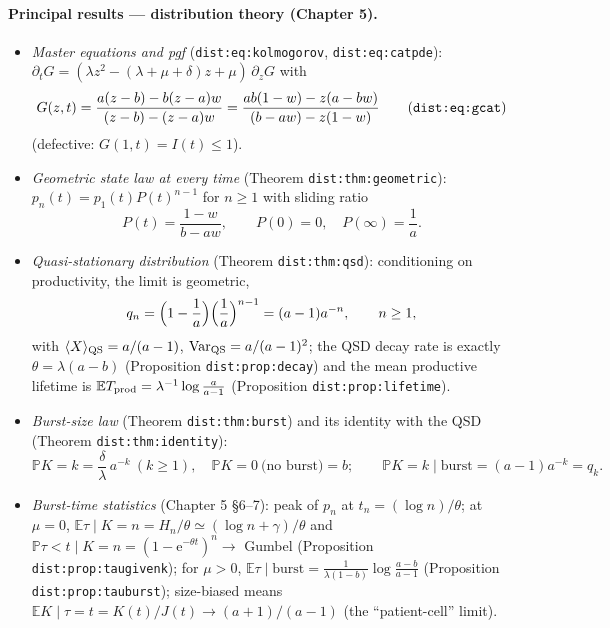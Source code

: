 \documentclass[11pt,a4paper]{article}
\newcommand{\PR}{\mathbb{P}}
\newcommand{\EX}{\mathbb{E}}
\newcommand{\Var}{\operatorname{Var}}
\newcommand{\ee}{\mathrm{e}}
\begin{document}
\paragraph{Principal results --- distribution theory (Chapter 5).}
\begin{itemize}
\item \emph{Master equations and pgf} (\texttt{dist:eq:kolmogorov},
  \texttt{dist:eq:catpde}): $\partial_tG=(\lambda z^2-(\lambda+\mu+\delta)z+
  \mu)\,\partial_zG$ with
  \[
  G(z,t)=\frac{a(z-b)-b(z-a)w}{(z-b)-(z-a)w}
  =\frac{ab(1-w)-z(a-bw)}{(b-aw)-z(1-w)}
  \qquad\text{(\texttt{dist:eq:gcat})}
  \]
  (defective: $G(1,t)=I(t)\le1$).
\item \emph{Geometric state law at every time} (Theorem
  \texttt{dist:thm:geometric}): $p_n(t)=p_1(t)P(t)^{n-1}$ for $n\ge1$ with
  sliding ratio
  \[
  P(t)=\frac{1-w}{b-aw},\qquad P(0)=0,\quad P(\infty)=\frac1a .
  \]
\item \emph{Quasi-stationary distribution} (Theorem \texttt{dist:thm:qsd}):
  conditioning on productivity, the limit is geometric,
  \[
  q_n=\Bigl(1-\frac1a\Bigr)\Bigl(\frac1a\Bigr)^{n-1}=(a-1)a^{-n},\qquad n\ge1,
  \]
  with $\langle X\rangle_{\rm QS}=a/(a-1)$, $\Var_{\rm QS}=a/(a-1)^2$; the
  QSD decay rate is exactly $\theta=\lambda(a-b)$ (Proposition
  \texttt{dist:prop:decay}) and the mean productive lifetime is
  $\EX{T_{\rm prod}}=\lambda^{-1}\log\frac{a}{a-1}$ (Proposition
  \texttt{dist:prop:lifetime}).
\item \emph{Burst-size law} (Theorem \texttt{dist:thm:burst}) and its
  identity with the QSD (Theorem \texttt{dist:thm:identity}):
  \[
  \PR{K=k}=\frac{\delta}{\lambda}\,a^{-k}\ (k\ge1),\quad
  \PR{K=0\ \text{(no burst)}}=b;\qquad
  \PR{K=k\mid\text{burst}}=(a-1)a^{-k}=q_k .
  \]
\item \emph{Burst-time statistics} (Chapter 5 \S6--7): peak of $p_n$ at
  $t_n=(\log n)/\theta$; at $\mu=0$,
  $\EX{\tau\mid K=n}=H_n/\theta\simeq(\log n+\gamma)/\theta$ and
  $\PR{\tau<t\mid K=n}=(1-\ee^{-\theta t})^n\to$ Gumbel
  (Proposition \texttt{dist:prop:taugivenk}); for $\mu>0$,
  $\EX{\tau\mid\text{burst}}=\frac{1}{\lambda(1-b)}\log\frac{a-b}{a-1}$
  (Proposition \texttt{dist:prop:tauburst}); size-biased means
  $\EX{K\mid\tau=t}=K(t)/J(t)\to(a+1)/(a-1)$ (the ``patient-cell'' limit).
\end{itemize}
\end{document}
